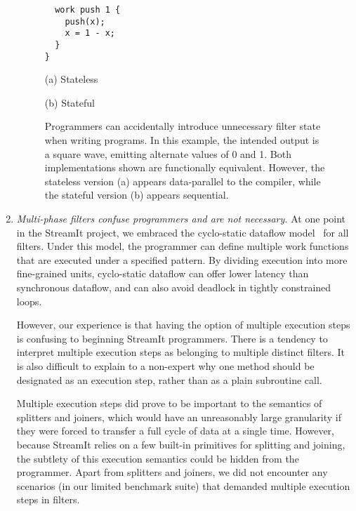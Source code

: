 \begin{enumerate}
\begin{figure}[t]
\begin{minipage}{0.35\textwidth}
\begin{verbatim}
  work push 1 {
    push(x);
    x = 1 - x;
  }
}
\end{verbatim}
\end{minipage}

\hspace{0.1\textwidth}
\begin{minipage}{0.35\textwidth}
\centering
(a) Stateless
\end{minipage}
\hspace{0.1\textwidth}
\begin{minipage}{0.35\textwidth}
\centering
(b) Stateful
\end{minipage}
\caption[Accidental introduction of filter state]{Programmers can
  accidentally introduce unnecessary filter state when writing
  programs.  In this example, the intended output is a square wave,
  emitting alternate values of 0 and 1.  Both implementations shown
  are functionally equivalent.  However, the stateless version (a)
  appears data-parallel to the compiler, while the stateful version
  (b) appears sequential.\protect\label{fig:state}}
\end{figure}

\item {\it Multi-phase filters confuse programmers and are not
  necessary.}  At one point in the StreamIt project, we embraced the
  cyclo-static dataflow
  model~\cite{bilsen_cyclo-static_1995,parks_comparison_1995} for all
  filters.  Under this model, the programmer can define multiple work
  functions that are executed under a specified pattern.  By dividing
  execution into more fine-grained units, cyclo-static dataflow can
  offer lower latency than synchronous dataflow, and can also avoid
  deadlock in tightly constrained loops.

  However, our experience is that having the option of multiple
  execution steps is confusing to beginning StreamIt programmers.
  There is a tendency to interpret multiple execution steps as
  belonging to multiple distinct filters.  It is also difficult to
  explain to a non-expert why one method should be designated as an
  execution step, rather than as a plain subroutine call.

  Multiple execution steps did prove to be important to the semantics
  of splitters and joiners, which would have an unreasonably large
  granularity if they were forced to transfer a full cycle of data at
  a single time.  However, because StreamIt relies on a few built-in
  primitives for splitting and joining, the subtlety of this execution
  semantics could be hidden from the programmer.  Apart from splitters
  and joiners, we did not encounter any scenarios (in our limited
  benchmark suite) that demanded multiple execution steps in filters.


\end{enumerate}
